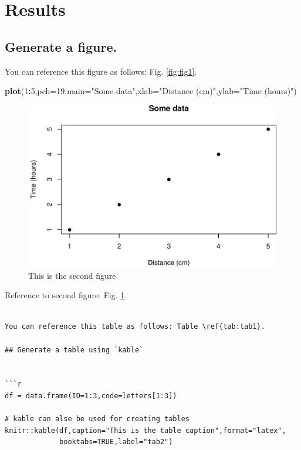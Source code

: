 \documentclass[12pt,halfline,a4paper,]{ouparticle}
\newenvironment{Shaded}{\begin{snugshade}}{\end{snugshade}}
\newcommand{\DataTypeTok}[1]{\textcolor[rgb]{0.13,0.29,0.53}{#1}}
\newcommand{\DecValTok}[1]{\textcolor[rgb]{0.00,0.00,0.81}{#1}}
\newcommand{\KeywordTok}[1]{\textcolor[rgb]{0.13,0.29,0.53}{\textbf{#1}}}
\newcommand{\NormalTok}[1]{#1}
\newcommand{\OperatorTok}[1]{\textcolor[rgb]{0.81,0.36,0.00}{\textbf{#1}}}
\newcommand{\StringTok}[1]{\textcolor[rgb]{0.31,0.60,0.02}{#1}}
\begin{document}
\hypertarget{results}{%
\section{Results}\label{results}}

\hypertarget{generate-a-figure.}{%
\subsection{Generate a figure.}\label{generate-a-figure.}}

You can reference this figure as follows: Fig. \ref{fig:fig1}.

\begin{Shaded}
\begin{Highlighting}[]
\KeywordTok{plot}\NormalTok{(}\DecValTok{1}\OperatorTok{:}\DecValTok{5}\NormalTok{,}\DataTypeTok{pch=}\DecValTok{19}\NormalTok{,}\DataTypeTok{main=}\StringTok{"Some data"}\NormalTok{,}\DataTypeTok{xlab=}\StringTok{"Distance (cm)"}\NormalTok{,}\DataTypeTok{ylab=}\StringTok{"Time (hours)"}\NormalTok{)}
\end{Highlighting}
\end{Shaded}

\begin{figure}[p]
\includegraphics[width=1\linewidth]{Markdown-v3.1_files/figure-latex/fig2-1} \caption{This is the second figure.}\label{fig:fig2}
\end{figure}

Reference to second figure: Fig. \ref{fig:fig2}

\begin{verbatim}

You can reference this table as follows: Table \ref{tab:tab1}.

## Generate a table using `kable`


```r
df = data.frame(ID=1:3,code=letters[1:3])

# kable can alse be used for creating tables
knitr::kable(df,caption="This is the table caption",format="latex",
             booktabs=TRUE,label="tab2")
\end{verbatim}
\end{document}
